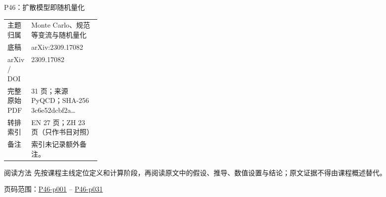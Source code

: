 \documentclass[aspectratio=169,10pt]{ctexbeamer}
\begin{document}
\begin{frame}[t]{P46：扩散模型即随机量化}
\small\begin{tabularx}{\linewidth}{p{0.22\linewidth}Y}
\toprule 主题归属 & Monte Carlo、规范等变流与随机量化\\
底稿 & arXiv:2309.17082\\
arXiv / DOI & 2309.17082\\
完整原始 PDF & 31 页；来源 PyQCD；SHA-256 3c6e52dcbf2a\ldots\\
转排索引 & EN 27 页；ZH 23 页（只作书目对照）\\
备注 & 索引未记录额外备注。\\
\bottomrule\end{tabularx}\vspace{0.25cm}
\begin{block}{阅读方法}
先按课程主线定位定义和计算阶段，再阅读原文中的假设、推导、数值设置与结论；原文证据不得由课程概述替代。
\end{block}
\vfill 页码范围：\hyperlink{P46-p001}{P46-p001} -- \hyperlink{P46-p031}{P46-p031}
\end{frame}
\end{document}
